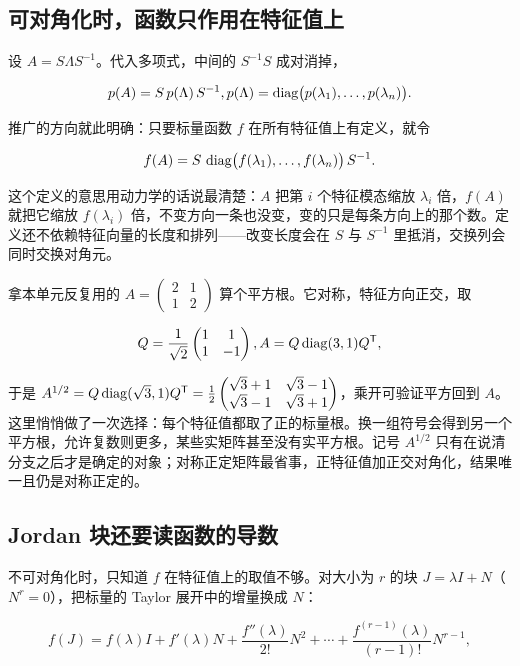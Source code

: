 \subsection{可对角化时，函数只作用在特征值上}

设 \(A=S\Lambda S^{-1}\)。代入多项式，中间的 \(S^{-1}S\) 成对消掉，

\[
p(A)=S\,p(\Lambda)\,S^{-1},
\space
p(\Lambda)=\operatorname{diag}\bigl(p(\lambda_1),\dots,p(\lambda_n)\bigr).
\]

推广的方向就此明确：只要标量函数 \(f\) 在所有特征值上有定义，就令

\[
f(A)=S\,\operatorname{diag}\bigl(f(\lambda_1),\dots,f(\lambda_n)\bigr)\,S^{-1}.
\]

这个定义的意思用动力学的话说最清楚：\(A\) 把第 \(i\) 个特征模态缩放 \(\lambda_i\) 倍，\(f(A)\) 就把它缩放 \(f(\lambda_i)\) 倍，不变方向一条也没变，变的只是每条方向上的那个数。定义还不依赖特征向量的长度和排列——改变长度会在 \(S\) 与 \(S^{-1}\) 里抵消，交换列会同时交换对角元。

拿本单元反复用的 \(A=\begin{pmatrix}2&1\\1&2\end{pmatrix}\) 算个平方根。它对称，特征方向正交，取

\[
Q=\frac1{\sqrt2}\begin{pmatrix}1&1\\1&-1\end{pmatrix},
\space
A=Q\operatorname{diag}(3,1)Q^{\mathsf{T}},
\]

于是 \(A^{1/2}=Q\operatorname{diag}(\sqrt3,1)Q^{\mathsf{T}}=\frac12\begin{pmatrix}\sqrt3+1&\sqrt3-1\\\sqrt3-1&\sqrt3+1\end{pmatrix}\)，乘开可验证平方回到 \(A\)。这里悄悄做了一次选择：每个特征值都取了正的标量根。换一组符号会得到另一个平方根，允许复数则更多，某些实矩阵甚至没有实平方根。记号 \(A^{1/2}\) 只有在说清分支之后才是确定的对象；对称正定矩阵最省事，正特征值加正交对角化，结果唯一且仍是对称正定的。

\subsection{Jordan 块还要读函数的导数}

不可对角化时，只知道 \(f\) 在特征值上的取值不够。对大小为 \(r\) 的块 \(J=\lambda I+N\)（\(N^r=0\)），把标量的 Taylor 展开中的增量换成 \(N\)：

\[
f(J)=f(\lambda)I+f'(\lambda)N+\frac{f''(\lambda)}{2!}N^2+\cdots+\frac{f^{(r-1)}(\lambda)}{(r-1)!}N^{r-1},
\]

